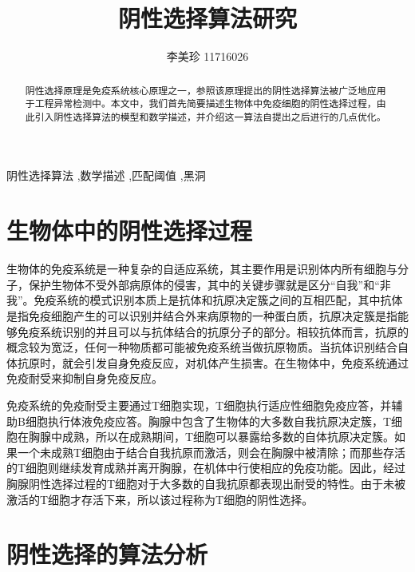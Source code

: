 \documentclass[preprint,12pt,3p]{elsarticle}
\begin{document}
\setlength{\baselineskip}{20pt}
\setlength\parindent{2em}
\begin{frontmatter}

\title{阴性选择算法研究}
\author{李美珍 11716026}
\address{农业与生物技术学院}

\begin{abstract}
阴性选择原理是免疫系统核心原理之一，参照该原理提出的阴性选择算法被广泛地应用于工程异常检测中。本文中，我们首先简要描述生物体中免疫细胞的阴性选择过程，由此引入阴性选择算法的模型和数学描述，并介绍这一算法自提出之后进行的几点优化。
\end{abstract}

\begin{keyword}
阴性选择算法 \sep 数学描述 \sep 匹配阈值 \sep 黑洞  
\end{keyword}

\end{frontmatter}

\section{生物体中的阴性选择过程}
\label{sec1}
生物体的免疫系统是一种复杂的自适应系统，其主要作用是识别体内所有细胞与分子，保护生物体不受外部病原体的侵害，其中的关键步骤就是区分“自我”和“非我”。免疫系统的模式识别本质上是抗体和抗原决定簇之间的互相匹配，其中抗体是指免疫细胞产生的可以识别并结合外来病原物的一种蛋白质，抗原决定簇是指能够免疫系统识别的并且可以与抗体结合的抗原分子的部分。相较抗体而言，抗原的概念较为宽泛，任何一种物质都可能被免疫系统当做抗原物质。当抗体识别结合自体抗原时，就会引发自身免疫反应，对机体产生损害。在生物体中，免疫系统通过免疫耐受来抑制自身免疫反应。
\par
免疫系统的免疫耐受主要通过T细胞实现，T细胞执行适应性细胞免疫应答，并辅助B细胞执行体液免疫应答。胸腺中包含了生物体的大多数自我抗原决定簇，T细胞在胸腺中成熟，所以在成熟期间，T细胞可以暴露给多数的自体抗原决定簇。如果一个未成熟T细胞由于结合自我抗原而激活，则会在胸腺中被清除；而那些存活的T细胞则继续发育成熟并离开胸腺，在机体中行使相应的免疫功能。因此，经过胸腺阴性选择过程的T细胞对于大多数的自我抗原都表现出耐受的特性。由于未被激活的T细胞才存活下来，所以该过程称为T细胞的阴性选择。

\section{阴性选择的算法分析}
\label{sec1}
\end{document}
